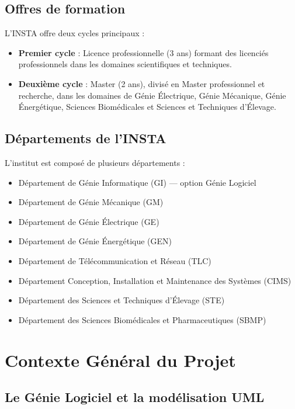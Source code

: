 \subsection{Offres de formation}

L'INSTA offre deux cycles principaux :

\begin{itemize}
    \item \textbf{Premier cycle} : Licence professionnelle (3 ans) formant des licenciés professionnels dans les domaines scientifiques et techniques.
    \item \textbf{Deuxième cycle} : Master (2 ans), divisé en Master professionnel et recherche, dans les domaines de Génie Électrique, Génie Mécanique, Génie Énergétique, Sciences Biomédicales et Sciences et Techniques d'Élevage.
\end{itemize}

\subsection{Départements de l'INSTA}

L'institut est composé de plusieurs départements :

\begin{itemize}
    \item Département de Génie Informatique (GI) — option Génie Logiciel
    \item Département de Génie Mécanique (GM)
    \item Département de Génie Électrique (GE)
    \item Département de Génie Énergétique (GEN)
    \item Département de Télécommunication et Réseau (TLC)
    \item Département Conception, Installation et Maintenance des Systèmes (CIMS)
    \item Département des Sciences et Techniques d'Élevage (STE)
    \item Département des Sciences Biomédicales et Pharmaceutiques (SBMP)
\end{itemize}

\section{Contexte Général du Projet}

\subsection{Le Génie Logiciel et la modélisation UML}

